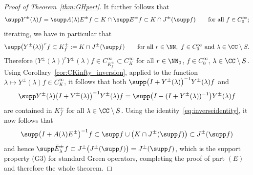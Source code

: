 \begin{proof}[Proof of Theorem~\ref{thm:GHpert}]
 	It further follows that
 	\begin{equation*}
 		\supp Y^\pm(\lambda) f =\supp A(\lambda)E^\pm f\subset K\cap \supp E^\pm f\subset K\cap J^\pm(\supp f)
 		\qquad \text{for all} \ f\in C_0^\infty;
 	\end{equation*}
iterating, we have in particular that
 	\begin{equation*}
 		\supp \big(Y^\pm(\lambda)\big)^r f\subset K^\pm_f:= K\cap J^\pm(\supp f) \qquad \text{for all} \ r\in \NN,\ f\in C_0^\infty \ \text{and} \ \lambda\in\CC\setminus S.
 	\end{equation*}	
 	Therefore $\big(Y^\pm(\lambda)\big)^r Y^\pm(\lambda) f\in C^\infty_{K^\pm_f}\subset C^\infty_K$ for all $r\in\NN_0$, $f\in C_0^\infty$, $\lambda\in \CC\setminus S$.
 	Using Corollary~\ref{cor:CKinfty_inversion}, applied to the function $\lambda\mapsto Y^\pm(\lambda) f\in C^\infty_K$, it follows that both
 	$\supp \big(I+Y^\pm(\lambda)\big)^{-1} Y^\pm(\lambda) f$ and
 	\begin{equation*}
 		\supp Y^\pm(\lambda) \big(I+Y^\pm(\lambda)\big)^{-1} Y^\pm(\lambda) f= \supp \big(I-(I+ Y^\pm(\lambda))^{-1}\big) Y^\pm(\lambda) f
 	\end{equation*}
 	are contained in $K^\pm_f$ for all $\lambda\in \CC\setminus S$. Using the identity~\eqref{eq:inverseidentity},
 	it now follows that
 	\begin{equation*}
 		\supp \big(I+ A(\lambda)E^\pm\big)^{-1} f \subset \supp f\cup \left(K\cap J^\pm(\supp f)\right) \subset
 		J^\pm(\supp f)
 	\end{equation*}
 	and hence $\supp \tilde{E}^\pm_\lambda f \subset J^\pm\big(J^\pm(\supp f)\big)=J^\pm(\supp f)$, which is the support property (G3) for standard Green operators, completing the proof of part $(E)$ and therefore the whole theorem.
 \end{proof}
